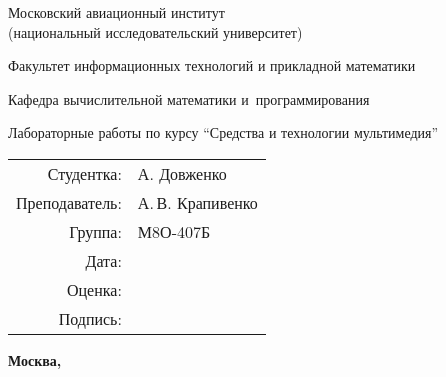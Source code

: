 \begin{titlepage}
\begin{center}
\bfseries

{\Large Московский авиационный институт\\ (национальный исследовательский университет)

}

\vspace{48pt}

{\large Факультет информационных технологий и прикладной математики
}

\vspace{36pt}


{\large Кафедра вычислительной математики и~программирования

}


\vspace{48pt}

Лабораторные работы по курсу \enquote{Средства и технологии мультимедия}

\end{center}

\vspace{72pt}

\begin{flushright}
\begin{tabular}{rl}
Студентка: & А. Довженко \\
Преподаватель: & А.\,В. Крапивенко \\
Группа: & М8О-407Б \\
Дата: & \\
Оценка: & \\
Подпись: & \\
\end{tabular}
\end{flushright}

\vfill

\begin{center}
\bfseries
Москва, \the\year
\end{center}
\end{titlepage}

\pagebreak